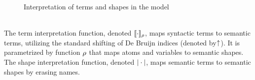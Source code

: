 \documentclass[english, mgr]{iithesis}
\begin{document}
\begin{figure}[htbp]
  \centering
  \caption{Interpretation of terms and shapes in the model}
  \label{fig:terms-shapes-interpretation}
\end{figure}
\\
The term interpretation function, denoted $\llbracket \cdot \rrbracket_{\rho}$,
maps syntactic terms to semantic terms,
utilizing the standard shifting of De Bruijn indices (denoted by { }$\kern-3pt \uparrow$).
It is parametrized by function $\rho$ that maps atoms and variables to
semantic shapes.\\
The shape interpretation function, denoted $|\cdot|$,
maps semantic terms to semantic shapes by erasing names.
\end{document}
